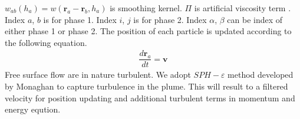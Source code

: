\documentclass[conference,compsoc]{IEEEtran}
\begin{document}
$w_{ab} (h_a)= w(\textbf{r}_a-\textbf{r}_b,h_a)$ is smoothing kernel.
$\Pi$ is artificial viscosity term \cite{monaghan1992smoothed}.
Index $a$, $b$ is for phase 1.
Index $i$, $j$ is for phase 2.
Index $\alpha$, $\beta$ can be index of either phase 1 or phase 2.
The position of each particle is updated according to the following equation.
\begin{align}
\dfrac{d \textbf{r}_a}{dt} = \textbf{v} \label{eq:gov-update-pos}
\end{align}
Free surface flow are in nature turbulent. We adopt $SPH-\varepsilon$ method developed by Monaghan\cite{monaghan2011turbulence} to capture turbulence in the plume. This will result to a filtered velocity for position updating and additional turbulent terms in momentum and energy eqution.
\end{document}
